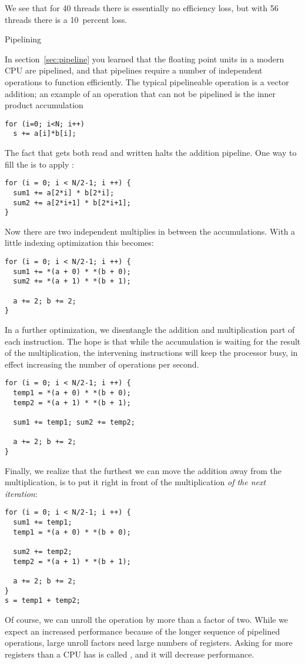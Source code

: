 We see that for 40 threads there is essentially no efficiency loss,
but with 56 threads there is a 10~percent loss.

{\scriptsize%

}%

 {Pipelining}
\label{sec:coding-pipeline}

In section~\ref{sec:pipeline} you learned that the floating point
units in a modern CPU are pipelined, and that pipelines require a
number of independent operations to function efficiently. The typical
pipelineable operation is a vector addition; an example of an
operation that can not be pipelined is the inner product accumulation
\begin{verbatim}
for (i=0; i<N; i++)
  s += a[i]*b[i];
\end{verbatim}
The fact that  gets both read and written halts the addition
pipeline. One way to fill the 
is to apply :
\begin{verbatim}
for (i = 0; i < N/2-1; i ++) {
  sum1 += a[2*i] * b[2*i];
  sum2 += a[2*i+1] * b[2*i+1];
}
\end{verbatim}
Now there are two independent multiplies in between the accumulations.
With a little indexing optimization this becomes:
\begin{verbatim}
for (i = 0; i < N/2-1; i ++) {
  sum1 += *(a + 0) * *(b + 0);
  sum2 += *(a + 1) * *(b + 1);

  a += 2; b += 2;
}
\end{verbatim}

In a further optimization, we disentangle the addition and
multiplication part of each instruction. The hope is that while the
accumulation is waiting for the result of the multiplication, the
intervening instructions will keep the processor busy, in effect
increasing the number of operations per second.
\begin{verbatim}
for (i = 0; i < N/2-1; i ++) {
  temp1 = *(a + 0) * *(b + 0);
  temp2 = *(a + 1) * *(b + 1);

  sum1 += temp1; sum2 += temp2;

  a += 2; b += 2;
}
\end{verbatim}
Finally, we realize that the furthest we can move the addition away
from the multiplication, is to put it right in front of the
multiplication \emph{of the next iteration}:
\begin{verbatim}
for (i = 0; i < N/2-1; i ++) {
  sum1 += temp1;
  temp1 = *(a + 0) * *(b + 0);

  sum2 += temp2;
  temp2 = *(a + 1) * *(b + 1);

  a += 2; b += 2;
}
s = temp1 + temp2;
\end{verbatim}
Of course, we can unroll the operation by more than a factor of
two. While we expect an increased performance because of the longer
sequence of pipelined operations, large unroll factors
need large numbers of registers. Asking for more registers than a CPU
has is called , and it will decrease
performance.

